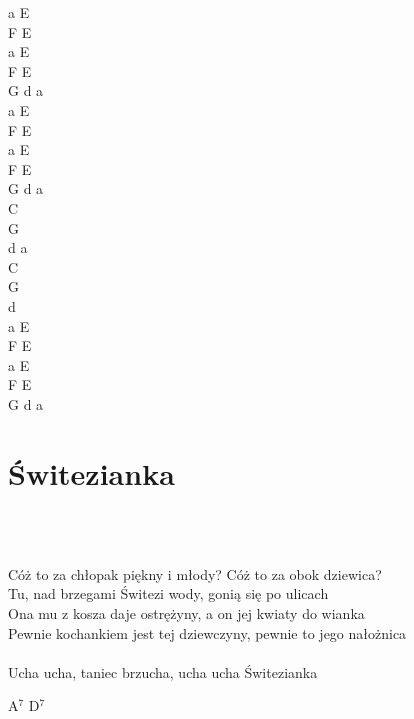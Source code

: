 \documentclass[a5paper, 10pt]{book}
\begin{document}
\begin{minipage}[t]{0.2\textwidth}
a E\\
F E\\
a E\\
F E\\
G d a\\

a E\\
F E\\
a E\\
F E\\
G d a\\

C\\
G\\
d a\\
C\\
G\\
d\\

a E\\
F E\\
a E\\
F E\\
G d a\\
\end{minipage}

\newpage
\section{Świtezianka}\textcolor{lightgray}{\textit{}}\\~\\
\begin{minipage}[t]{0.8\textwidth}
Cóż to za chłopak piękny i młody? Cóż to za obok dziewica?\\
Tu, nad brzegami Świtezi wody, gonią się po ulicach\\
Ona mu z kosza daje ostrężyny, a on jej kwiaty do wianka\\
Pewnie kochankiem jest tej dziewczyny, pewnie to jego nałożnica\\
\\
\hspace*{5mm}Ucha ucha, taniec brzucha, ucha ucha Świtezianka\\
\end{minipage}
\begin{minipage}[t]{0.2\textwidth}
A$^7$ D$^7$\\
\end{minipage}

\newpage
\end{document}
